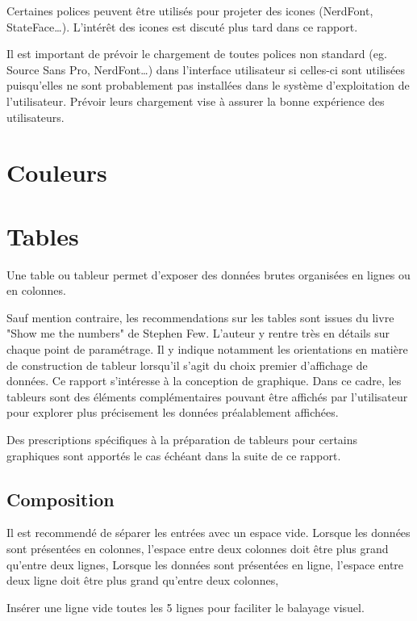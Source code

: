 \documentclass[a4paper,12pt]{article}
\begin{document}
\begin{multicols}{2}
Certaines polices peuvent être utilisés pour projeter des icones (NerdFont, StateFace\ldots{}).\autocite{jonathanschwabishQualitative2021} L'intérêt des icones est discuté plus tard dans ce rapport.

Il est important de prévoir le chargement de toutes polices non standard (eg. Source Sans Pro, NerdFont\ldots{}) dans l'interface utilisateur si celles-ci sont utilisées puisqu'elles ne sont probablement pas installées dans le système d'exploitation de l'utilisateur. Prévoir leurs chargement vise à assurer la bonne expérience des utilisateurs.
\section*{Couleurs}
\label{sec:org475a9ce}

\section*{Tables}
\label{sec:orgcaf7fbe}
Une table ou tableur permet d'exposer des données brutes organisées en lignes ou en colonnes. \autocite{mikeyiHowChooseRight2020}

Sauf mention contraire, les recommendations sur les tables sont issues du livre "Show me the numbers" de Stephen Few.\autocite{stephenfewShowMeNumbers2012} L'auteur y rentre très en détails sur chaque point de paramétrage. Il y indique notamment les orientations en matière de construction de tableur lorsqu'il s'agit du choix premier d'affichage de données. Ce rapport s'intéresse à la conception de graphique. Dans ce cadre, les tableurs sont des éléments complémentaires pouvant être affichés par l'utilisateur pour explorer plus précisement les données préalablement affichées.

Des prescriptions spécifiques à la préparation de tableurs pour certains graphiques sont apportés le cas échéant dans la suite de ce rapport.
\subsection*{Composition}
\label{sec:org17e23d9}
Il est recommendé de séparer les entrées avec un espace vide.
Lorsque les données sont présentées en colonnes, l'espace entre deux colonnes doit être plus grand qu'entre deux lignes,
Lorsque les données sont présentées en ligne, l'espace entre deux ligne doit être plus grand qu'entre deux colonnes,

Insérer une ligne vide toutes les 5 lignes pour faciliter le balayage visuel. \autocite{NFENISO9241-125ErgonomieLinteractionHommesysteme2017}


\end{multicols}
\end{document}

